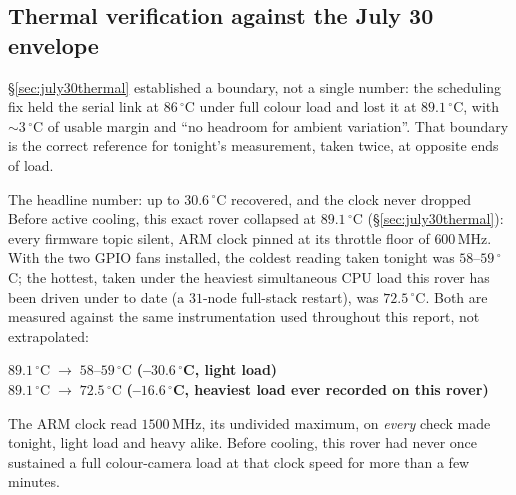 \subsection{Thermal verification against the July 30 envelope}
\label{sec:aug11thermal}

\S\ref{sec:july30thermal} established a boundary, not a single number: the
scheduling fix held the serial link at $86\,^\circ$C under full colour load
and lost it at $89.1\,^\circ$C, with $\sim3\,^\circ$C of usable margin and
``no headroom for ambient variation''. That boundary is the correct
reference for tonight's measurement, taken twice, at opposite ends of load.

\begin{casestudy}{The headline number: up to $30.6\,^\circ$C recovered, and
the clock never dropped}
Before active cooling, this exact rover collapsed at $89.1\,^\circ$C
(\S\ref{sec:july30thermal}): every firmware topic silent, ARM clock pinned at
its throttle floor of $600$\,MHz. With the two GPIO fans installed, the
coldest reading taken tonight was $58$--$59\,^\circ$C; the hottest, taken
under the heaviest simultaneous CPU load this rover has been driven under to
date (a $31$-node full-stack restart), was $72.5\,^\circ$C. Both are measured
against the same  instrumentation used throughout this report,
not extrapolated:
\begin{center}
\large $89.1\,^\circ\text{C} \;\longrightarrow\; 58$--$59\,^\circ\text{C}$
\quad\textbf{(--$30.6\,^\circ$C, light load)} \\[5pt]
\large $89.1\,^\circ\text{C} \;\longrightarrow\; 72.5\,^\circ\text{C}$
\quad\textbf{(--$16.6\,^\circ$C, heaviest load ever recorded on this rover)}
\end{center}
The ARM clock read $1500$\,MHz, its undivided maximum, on \emph{every} check
made tonight, light load and heavy alike. Before cooling, this rover had
never once sustained a full colour-camera load at that clock speed for more
than a few minutes.
\end{casestudy}

